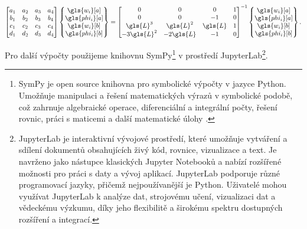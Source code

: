 \begin{equation}
    \label{eq:shape_func_bnd_cond}
    \begin{bmatrix}
        a_1 & a_2 & a_3 & a_4 \\
        b_1 & b_2 & b_3 & b_4 \\
        c_1 & c_2 & c_3 & c_4 \\
        d_1 & d_2 & d_3 & d_4 \\
    \end{bmatrix}
    \begin{Bmatrix}
        \gls{w_i}[a] \\
        \gls{phi_i}[a] \\
        \gls{w_i}[b] \\
        \gls{phi_i}[b] \\
    \end{Bmatrix}
    =
    \begin{bmatrix}
        0 & 0 & 0 & 1 \\
        0 & 0 & -1 & 0 \\
        \gls{L}^{3} & \gls{L}^{2} & \gls{L} & 1 \\
        -3 \gls{L}^{2} & -2 \gls{L} & -1 & 0 \\
    \end{bmatrix}^{-1}
    \begin{Bmatrix}
        \gls{w_i}[a] \\
        \gls{phi_i}[a] \\
        \gls{w_i}[b] \\
        \gls{phi_i}[b] \\
    \end{Bmatrix}.
\end{equation}

Pro další výpočty použijeme knihovnu SymPy\footnote{
    SymPy je open source knihovna pro symbolické výpočty v jazyce Python. Umožňuje manipulaci a řešení matematických výrazů v symbolické podobě, což zahrnuje algebraické operace, diferenciální a integrální počty, řešení rovnic, práci s maticemi a další matematické úlohy \cite{sympy}.
} v prostředí JupyterLab\footnote{
JupyterLab je interaktivní vývojové prostředí, které umožňuje vytváření a sdílení dokumentů obsahujících živý kód, rovnice, vizualizace a text. Je navrženo jako nástupce klasických Jupyter Notebooků a nabízí rozšířené možnosti pro práci s daty a vývoj aplikací. JupyterLab podporuje různé programovací jazyky, přičemž nejpoužívanější je Python. Uživatelé mohou využívat JupyterLab k analýze dat, strojovému učení, vizualizaci dat a vědeckému výzkumu, díky jeho flexibilitě a širokému spektru dostupných rozšíření a integrací.
}.


